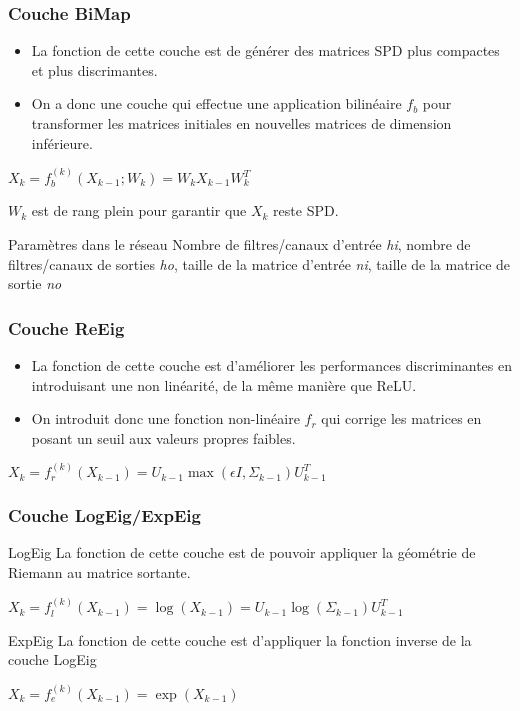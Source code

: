 \documentclass{beamer}
\begin{document}
\begin{frame}
\frametitle{Couche BiMap}
\begin{itemize}
    \item La fonction de cette couche est de générer des matrices SPD plus compactes et plus discrimantes.
    \item On a donc une couche qui effectue une application bilinéaire $f_b$ pour transformer les matrices initiales en nouvelles matrices de dimension inférieure.
\end{itemize}

\begin{center}
    $ X_k = f_b^{(k)}(X_{k-1};W_k)=W_kX_{k-1}W_k^T$
\end{center}

$W_k$ est de rang plein pour garantir que $X_k$ reste SPD.

\begin{block}{Paramètres dans le réseau}
Nombre de filtres/canaux d'entrée \textit{hi}, nombre de filtres/canaux de sorties \textit{ho}, taille de la matrice d'entrée \textit{ni}, taille de la matrice de sortie \textit{no}
\end{block}


\end{frame}
\begin{frame}
\frametitle{Couche ReEig}
\begin{itemize}
    \item La fonction de cette couche est d'améliorer les performances discriminantes en introduisant une non linéarité, de la même manière que ReLU.
    \item On introduit donc une fonction non-linéaire $f_r$ qui corrige les matrices en posant un seuil aux valeurs propres faibles. 
\end{itemize}

\begin{center}
    $ X_k = f_r^{(k)}(X_{k-1})=U_{k-1}\max(\epsilon I, \Sigma_{k-1})U_{k-1}^T$
\end{center}

\end{frame}

\begin{frame}
\frametitle{Couche LogEig/ExpEig}

\begin{block}{LogEig}
La fonction de cette couche est de pouvoir appliquer la géométrie de Riemann au matrice sortante.
\end{block}

\begin{center}
    $ X_k = f_l^{(k)}(X_{k-1})=\log (X_{k-1})=U_{k-1}\log(\Sigma_{k-1})U_{k-1}^T$
\end{center}

\begin{block}{ExpEig}
La fonction de cette couche est d'appliquer la fonction inverse de la couche LogEig
\end{block}

\begin{center}
    $ X_k = f_e^{(k)}(X_{k-1})=\exp (X_{k-1})$
\end{center}

\end{frame}
\end{document}
